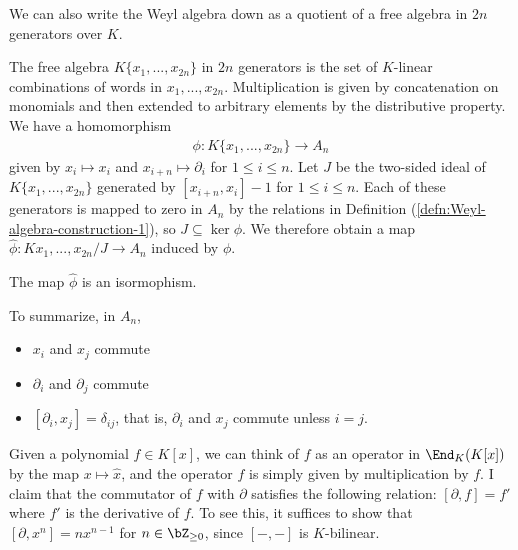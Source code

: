 We can also write the Weyl algebra down as a quotient of a free algebra in $2n$ generators over $K$. 

\begin{defn}\label{defn:Weyl-algebra-construction-2}
	The free algebra $K\{x_1,...,x_{2n}\}$ in $2n$ generators is the set of $K$-linear combinations of words in $x_1,...,x_{2n}$. Multiplication is given by concatenation on monomials and then extended to arbitrary elements by the distributive property. We have a homomorphism
	\begin{align*}
		\phi:K\{x_1,...,x_{2n}\} \to A_n
	\end{align*}
	given by $x_i \mapsto x_i$ and $x_{i+n} \mapsto \partial_i$ for $1\leq i\leq n$. Let $J$ be the two-sided ideal of  $K\{x_1,...,x_{2n}\}$ generated by $[x_{i+n},x_i] - 1$ for $1\leq i\leq n$. Each of these generators is mapped to zero in $A_n$ by the relations in Definition (\ref{defn:Weyl-algebra-construction-1}), so $J \subseteq \ker \phi$. We therefore obtain a map $\hat{\phi}:K{x_1,...,x_{2n}}/J\to A_n$ induced by $\phi$.
\end{defn}

\begin{thm}\label{thm:Weyl-constructions-iso}
	The map $\hat{\phi}$ is an isormophism.
\end{thm}

To summarize, in $A_n$,
\begin{itemize}
	\item $x_i$ and $x_j$ commute
	\item $\partial_i$ and $\partial_j$ commute
	\item $[\partial_i,x_j] = \delta_{ij}$, that is, $\partial_i$ and $x_j$ commute unless $i = j$.
\end{itemize}
\begin{example}\label{example:commutator-as-derivative-one-dim}
    Given a polynomial $f \in K[x]$, we can think of $f$ as an operator in $\End_K(K[x])$ by the map $x \mapsto \hat{x}$, and the operator $f$ is simply given by multiplication by $f$. I claim that the commutator of $f$ with $\partial$ satisfies the following relation: $[\partial, f] = f'$ where $f'$ is the derivative of $f$. To see this, it suffices to show that $[\partial, x^n] = nx^{n-1}$ for $n \in \bZ_{\geq 0}$, since $[-,-]$ is $K$-bilinear.
\end{example}

